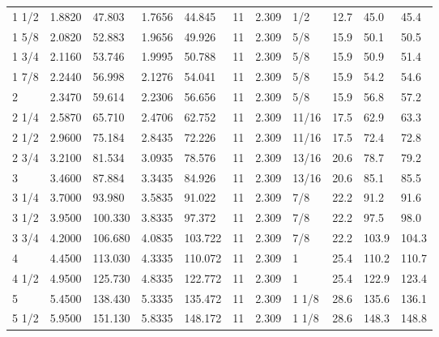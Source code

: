 \begin{table}[h!]
\begin{longtable}{l|ll|ll|ll|ll|ll}
     1 1/2&    1.8820&    47.803&    1.7656&    44.845&        11&     2.309&       1/2&      12.7&      45.0&      45.4\\
     1 5/8&    2.0820&    52.883&    1.9656&    49.926&        11&     2.309&       5/8&      15.9&      50.1&      50.5\\
     1 3/4&    2.1160&    53.746&    1.9995&    50.788&        11&     2.309&       5/8&      15.9&      50.9&      51.4\\
     1 7/8&    2.2440&    56.998&    2.1276&    54.041&        11&     2.309&       5/8&      15.9&      54.2&      54.6\\
         2&    2.3470&    59.614&    2.2306&    56.656&        11&     2.309&       5/8&      15.9&      56.8&      57.2\\
     2 1/4&    2.5870&    65.710&    2.4706&    62.752&        11&     2.309&     11/16&      17.5&      62.9&      63.3\\
     2 1/2&    2.9600&    75.184&    2.8435&    72.226&        11&     2.309&     11/16&      17.5&      72.4&      72.8\\
     2 3/4&    3.2100&    81.534&    3.0935&    78.576&        11&     2.309&     13/16&      20.6&      78.7&      79.2\\
         3&    3.4600&    87.884&    3.3435&    84.926&        11&     2.309&     13/16&      20.6&      85.1&      85.5\\
     3 1/4&    3.7000&    93.980&    3.5835&    91.022&        11&     2.309&       7/8&      22.2&      91.2&      91.6\\
     3 1/2&    3.9500&   100.330&    3.8335&    97.372&        11&     2.309&       7/8&      22.2&      97.5&      98.0\\
     3 3/4&    4.2000&   106.680&    4.0835&   103.722&        11&     2.309&       7/8&      22.2&     103.9&     104.3\\
         4&    4.4500&   113.030&    4.3335&   110.072&        11&     2.309&         1&      25.4&     110.2&     110.7\\
     4 1/2&    4.9500&   125.730&    4.8335&   122.772&        11&     2.309&         1&      25.4&     122.9&     123.4\\
         5&    5.4500&   138.430&    5.3335&   135.472&        11&     2.309&     1 1/8&      28.6&     135.6&     136.1\\
     5 1/2&    5.9500&   151.130&    5.8335&   148.172&        11&     2.309&     1 1/8&      28.6&     148.3&     148.8\\

\end{longtable}
\end{table}
